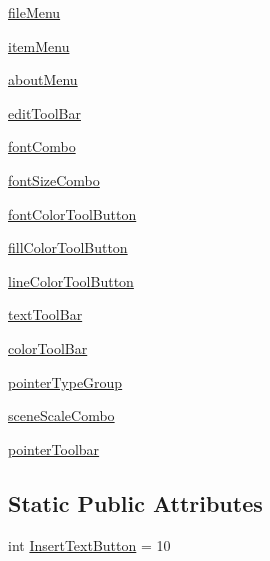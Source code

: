 \begin{DoxyCompactItemize}
\item 
\hyperlink{classdiagramscene_1_1MainWindow_a17ab1b3949008c06f8bd308cf42b0dd7}{file\+Menu}
\item 
\hyperlink{classdiagramscene_1_1MainWindow_acf8ca295bb173671a64710c7883bbb07}{item\+Menu}
\item 
\hyperlink{classdiagramscene_1_1MainWindow_a87808cf250601541465a0d60bc9a27aa}{about\+Menu}
\item 
\hyperlink{classdiagramscene_1_1MainWindow_a1cfc924b57c8cec9ea2233ca31b7baff}{edit\+Tool\+Bar}
\item 
\hyperlink{classdiagramscene_1_1MainWindow_a4f8335ff14b568522ade9927f51a5c27}{font\+Combo}
\item 
\hyperlink{classdiagramscene_1_1MainWindow_af5cb041ce2d64042d041ae9c31ef212f}{font\+Size\+Combo}
\item 
\hyperlink{classdiagramscene_1_1MainWindow_afb04dffee39793e3e696e2928d54ef01}{font\+Color\+Tool\+Button}
\item 
\hyperlink{classdiagramscene_1_1MainWindow_aec6526b5c32c3b27aefb6977cec682c8}{fill\+Color\+Tool\+Button}
\item 
\hyperlink{classdiagramscene_1_1MainWindow_a274ee73b3bfc63db398e2b51daef36af}{line\+Color\+Tool\+Button}
\item 
\hyperlink{classdiagramscene_1_1MainWindow_aaed3f2262256aa35d20c90520a50e6cd}{text\+Tool\+Bar}
\item 
\hyperlink{classdiagramscene_1_1MainWindow_a057d89a6294052a5273cfdc484e1f235}{color\+Tool\+Bar}
\item 
\hyperlink{classdiagramscene_1_1MainWindow_a82427cb429c25e084f0c74ba98682996}{pointer\+Type\+Group}
\item 
\hyperlink{classdiagramscene_1_1MainWindow_a45a77e981d1437dcc86217814ece6750}{scene\+Scale\+Combo}
\item 
\hyperlink{classdiagramscene_1_1MainWindow_a01b91390fa772018b122088ad4dd7112}{pointer\+Toolbar}
\end{DoxyCompactItemize}
\subsection*{Static Public Attributes}
\begin{DoxyCompactItemize}
\item 
int \hyperlink{classdiagramscene_1_1MainWindow_af86e3926e0a37ef1c91fd1f45880df8b}{Insert\+Text\+Button} = 10
\end{DoxyCompactItemize}


